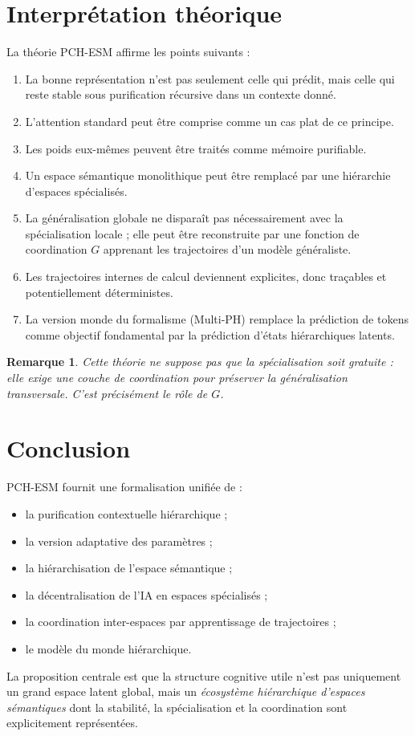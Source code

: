 \documentclass[11pt,a4paper]{article}
\newtheorem{remark}{Remarque}[section]
\newcommand{\1}{\mathbf 1}
\begin{document}
\section{Interprétation théorique}

La théorie PCH-ESM affirme les points suivants :

\begin{enumerate}[leftmargin=2em]
    \item La bonne représentation n'est pas seulement celle qui prédit, mais celle qui reste stable sous purification récursive dans un contexte donné.
    \item L'attention standard peut être comprise comme un cas plat de ce principe.
    \item Les poids eux-mêmes peuvent être traités comme mémoire purifiable.
    \item Un espace sémantique monolithique peut être remplacé par une hiérarchie d'espaces spécialisés.
    \item La généralisation globale ne disparaît pas nécessairement avec la spécialisation locale ; elle peut être reconstruite par une fonction de coordination \(G\) apprenant les trajectoires d'un modèle généraliste.
    \item Les trajectoires internes de calcul deviennent explicites, donc traçables et potentiellement déterministes.
    \item La version monde du formalisme (Multi-PH) remplace la prédiction de tokens comme objectif fondamental par la prédiction d'états hiérarchiques latents.
\end{enumerate}

\begin{remark}
Cette théorie ne suppose pas que la spécialisation soit gratuite : elle exige une couche de coordination pour préserver la généralisation transversale.
C'est précisément le rôle de \(G\).
\end{remark}

\section{Conclusion}

PCH-ESM fournit une formalisation unifiée de :
\begin{itemize}[leftmargin=2em]
    \item la purification contextuelle hiérarchique ;
    \item la version adaptative des paramètres ;
    \item la hiérarchisation de l'espace sémantique ;
    \item la décentralisation de l'IA en espaces spécialisés ;
    \item la coordination inter-espaces par apprentissage de trajectoires ;
    \item le modèle du monde hiérarchique.
\end{itemize}

La proposition centrale est que la structure cognitive utile n'est pas uniquement un grand espace latent global, mais un \emph{écosystème hiérarchique d'espaces sémantiques} dont la stabilité, la spécialisation et la coordination sont explicitement représentées.
\end{document}
